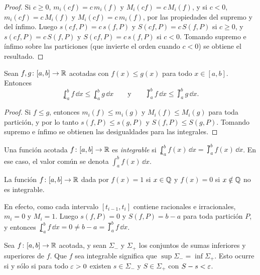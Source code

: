\begin{proof}
  Si \(c \geq 0\), \(m_i(cf) = c\, m_i(f)\) y \(M_i(cf) = c\, M_i(f)\), y si \(c < 0\), \(m_i(cf) = c\, M_i(f)\) y \(M_i(cf) = c\, m_i(f)\), por las propiedades del supremo y del ínfimo. Luego \(s(cf, P) = c\, s(f, P)\) y \(S(cf, P) = c\, S(f, P)\) si \(c \geq 0\), y \(s(cf, P) = c\, S(f, P)\) y \(S(cf, P) = c\, s(f, P)\) si \(c < 0\). Tomando supremo e ínfimo sobre las particiones (que invierte el orden cuando \(c < 0\)) se obtiene el resultado.
\end{proof}

\begin{prop}
  Sean \(f, g\colon [a, b] \to \mathbb{R}\) acotadas con \(f(x) \leq g(x)\) para todo \(x \in [a, b]\). Entonces
  \[
    \lowint_a^b f \,\dd x \leq \lowint_a^b g \,\dd x \qquad \text{y} \qquad \upint_a^b f \,\dd x \leq \upint_a^b g \,\dd x.
  \]
\end{prop}

\begin{proof}
  Si \(f \leq g\), entonces \(m_i(f) \leq m_i(g)\) y \(M_i(f) \leq M_i(g)\) para toda partición, y por lo tanto \(s(f, P) \leq s(g, P)\) y \(S(f, P) \leq S(g, P)\). Tomando supremo e ínfimo se obtienen las desigualdades para las integrales.
\end{proof}

\begin{definition}
  Una función acotada \(f\colon [a, b] \to \mathbb{R}\) es \emph{integrable} si \(\lowint_a^b f(x) \,\dd x = \upint_a^b f(x) \,\dd x\). En ese caso, el valor común se denota \(\int_a^b f(x) \,\dd x\).
\end{definition}

\begin{eg}
  La función \(f\colon [a, b] \to \mathbb{R}\) dada por \(f(x) = 1\) si \(x \in \mathbb{Q}\) y \(f(x) = 0\) si \(x \notin \mathbb{Q}\) no es integrable.

  En efecto, como cada intervalo \([t_{i-1}, t_i]\) contiene racionales e irracionales, \(m_i = 0\) y \(M_i = 1\). Luego \(s(f, P) = 0\) y \(S(f, P) = b - a\) para toda partición \(P\), y entonces \(\lowint_a^b f \,\dd x = 0 \neq b - a = \upint_a^b f \,\dd x\).
\end{eg}

\begin{note}
  Sea \(f\colon [a, b] \to \mathbb{R}\) acotada, y sean \(\Sigma_{-}\) y \(\Sigma_{+}\) los conjuntos de sumas inferiores y superiores de \(f\). Que \(f\) sea integrable significa que \(\sup \Sigma_{-} = \inf \Sigma_{+}\). Esto ocurre si y sólo si para todo \(\varepsilon > 0\) existen \(s \in \Sigma_{-}\) y \(S \in \Sigma_{+}\) con \(S - s < \varepsilon\).
\end{note}

